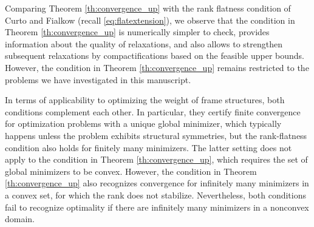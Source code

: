 \documentclass[final,onefignum,onetabnum]{siamart220329}
\begin{document}
Comparing Theorem \ref{th:convergence_up} with the rank flatness condition of Curto and Fialkow \cite{Curto1996} (recall \eqref{eq:flatextension}), we observe that the condition in Theorem \ref{th:convergence_up} is numerically simpler to check, provides information about the quality of relaxations, and also allows to strengthen subsequent relaxations by compactifications based on the feasible upper bounds. However, the condition in Theorem \ref{th:convergence_up} remains restricted to the problems we have investigated in this manuscript. 

In terms of applicability to optimizing the weight of frame structures, both conditions complement each other. In particular, they certify finite convergence for optimization problems with a unique global minimizer{, which typically happens unless the problem exhibits structural symmetries}, but the rank-flatness condition also holds for finitely many minimizers. The latter setting does not apply to the condition in Theorem \ref{th:convergence_up}, which requires the set of global minimizers to be convex. However, the condition in Theorem \ref{th:convergence_up} also recognizes convergence for infinitely many minimizers in a convex set{, for which the rank does not stabilize}. Nevertheless, both conditions fail to recognize optimality if there are infinitely many minimizers in a nonconvex domain.
\end{document}
